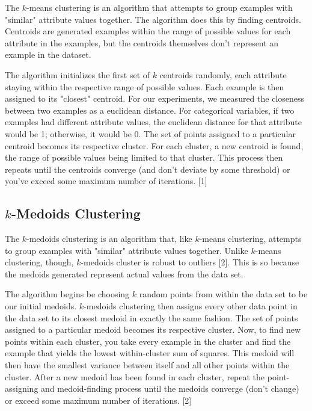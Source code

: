 \documentclass[twoside,11pt]{article}
\begin{document}
The $k$-means clustering is an algorithm that attempts to group examples with "similar" attribute values together. The algorithm does this by finding centroids. Centroids are generated examples within the range of possible values for each attribute in the examples, but the centroids themselves don't represent an example in the dataset.

The algorithm initializes the first set of $k$ centroids randomly, each attribute staying within the respective range of possible values. Each example is then assigned to its "closest" centroid. For our experiments, we measured the closeness between two examples as a euclidean distance. For categorical variables, if two examples had different attribute values, the euclidean distance for that attribute would be 1; otherwise, it would be 0. The set of points assigned to a particular centroid becomes its respective cluster. For each cluster, a new centroid is found, the range of possible values being limited to that cluster. This process then repeats until the centroids converge (and don't deviate by some threshold) or you've exceed some maximum number of iterations. [1]

\subsection{$k$-Medoids Clustering}

The $k$-medoids clustering is an algorithm that, like $k$-means clustering, attempts to group examples with "similar" attribute values together. Unlike $k$-means clustering, though, $k$-medoids cluster is robust to outliers [2]. This is so because the medoids generated represent actual values from the data set.

The algorithm begins be choosing $k$ random points from within the data set to be our initial medoids. $k$-medoids clustering then assigns every other data point in the data set to its closest medoid in exactly the same fashion. The set of points assigned to a particular medoid becomes its respective cluster. Now, to find new points within each cluster, you take every example in the cluster and find the example that yields the lowest within-cluster sum of squares. This medoid will then have the smallest variance between itself and all other points within the cluster. After a new medoid has been found in each cluster, repeat the point-assigning and medoid-finding process until the medoids converge (don't change) or exceed some maximum number of iterations. [2]
\end{document}
